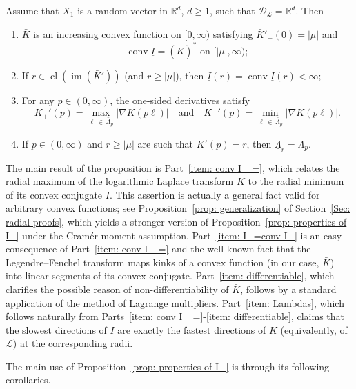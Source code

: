 \documentclass[AHL,Unicode,published]{cedram}
\DeclareMathOperator{\conv}{conv}
\DeclareMathOperator{\im}{im}
\DeclareMathOperator{\cl}{cl}
\newcommand{\ubar}[1]{\underline{#1}}
\newcommand{\Rbb}{\mathbb{R}}
\newcommand{\Dcl}{\mathcal{D}}
\newcommand{\Lcl}{\mathcal{L}}
\newcommand*{\alphenumi}{\renewcommand*{\theenumi}{\alph{enumi}}}
\begin{document}
\begin{prop}\label{prop: properties of I_}
Assume that $X_1$ is a random vector in $\Rbb^d$, $d \ge 1$, such that $\Dcl_{\Lcl} = \Rbb^d$. Then
\begin{enumerate}\alphenumi
\item \label{item: conv I_ =}
$\bar K$ is an increasing convex function on $[0, \infty)$ satisfying $\bar K'_+(0)=|\mu|$ and
\[
\conv \ubar I = (\bar{K})^* \text{ on }[|\mu|, \infty);
\]
\item \label{item: I_=conv I_}
If $r \in \cl (\im(\bar{K}'))$ (and $r \ge |\mu|$), then $\ubar I(r) = \conv \ubar I(r)<\infty$;
\item \label{item: differentiable}
For any $p \in (0,\infty)$, the one-sided derivatives satisfy
\[
\bar K_+'(p) = \max_{\ell\,\in\,\bar{\Lambda}_p} \left|\nabla K(p \ell)\right| \quad \text{and} \quad \bar K_-'(p) = \min_{\ell\,\in\,\bar{\Lambda}_p} |\nabla K (p \ell)|.
\]
\item \label{item: Lambdas}
If $p \in (0,\infty)$ and $r \ge |\mu|$ are such that $\bar{K}'(p)=r$, then $\ubar{\Lambda}_r = \bar{\Lambda}_p$.
\end{enumerate}
\end{prop}

The main result of the proposition is Part~\eqref{item: conv I_ =}, which relates the radial maximum of the logarithmic Laplace transform $K$ to the radial minimum of its convex conjugate $I$. This assertion is actually a general fact valid for arbitrary convex functions; see Proposition~\ref{prop: generalization} of Section~\ref{Sec: radial proofs}, which yields a stronger version of Proposition~\ref{prop: properties of I_} under the Cram\'er moment assumption. Part~\eqref{item: I_=conv I_} is an easy consequence of Part~\eqref{item: conv I_ =} and the well-known fact that the Legendre--Fenchel transform maps kinks of a convex function (in our case, $\bar K$) into linear segments of its convex conjugate. Part~\eqref{item: differentiable}, which clarifies the possible reason of non-differentiability of $\bar K$, follows by a standard application of the method of Lagrange multipliers. Part~\eqref{item: Lambdas}, which follows naturally from Parts~\eqref{item: conv I_ =}-\eqref{item: differentiable}, claims that the slowest directions of $I$ are exactly the fastest directions of $K$ (equivalently, of $\Lcl$) at the corresponding radii.

The main use of Proposition~\ref{prop: properties of I_} is through its following corollaries.
\end{document}
